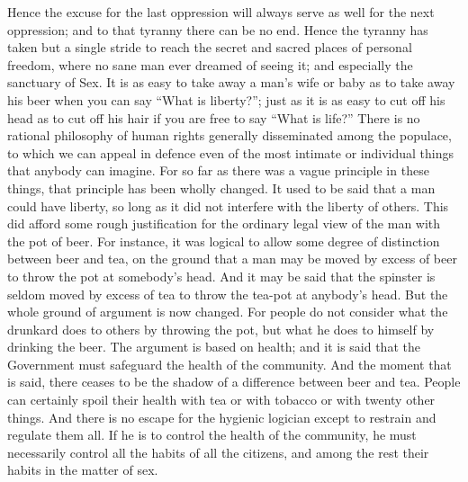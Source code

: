 \documentclass{book}
\begin{document}
Hence the excuse for the last oppression will always serve as well for the next oppression; and to that tyranny there can be no end. Hence the tyranny has taken but a single stride to reach the secret and sacred places of personal freedom, where no sane man ever dreamed of seeing it; and especially the sanctuary of Sex. It is as easy to take away a man’s wife or baby as to take away his beer when you can say “What is liberty?”; just as it is as easy to cut off his head as to cut off his hair if you are free to say “What is life?” There is no rational philosophy of human rights generally disseminated among the populace, to which we can appeal in defence even of the most intimate or individual things that anybody can imagine. For so far as there was a vague principle in these things, that principle has been wholly changed. It used to be said that a man could have liberty, so long as it did not interfere with the liberty of others. This did afford some rough justification for the ordinary legal view of the man with the pot of beer. For instance, it was logical to allow some degree of distinction between beer and tea, on the ground that a man may be moved by excess of beer to throw the pot at somebody’s head. And it may be said that the spinster is seldom moved by excess of tea to throw the tea-pot at anybody’s head. But the whole ground of argument is now changed. For people do not consider what the drunkard does to others by throwing the pot, but what he does to himself by drinking the beer. The argument is based on health; and it is said that the Government must safeguard the health of the community. And the moment that is said, there ceases to be the shadow of a difference between beer and tea. People can certainly spoil their health with tea or with tobacco or with twenty other things. And there is no escape for the hygienic logician except to restrain and regulate them all. If he is to control the health of the community, he must necessarily control all the habits of all the citizens, and among the rest their habits in the matter of sex.
\end{document}
